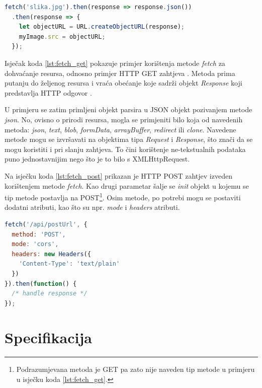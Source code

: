 \documentclass[times, utf8, zavrsni, numeric]{fer}
\newcommand{\razmakp}{\vspace{18pt}}
\newcommand{\razmaks}{\vspace{10pt}}
\begin{document}
\newpage

\razmakp
\begin{lstlisting}[language=JavaScript, caption={Primjer dohvata resursa s Fetch API}, label={lst:fetch_get}]
fetch('slika.jpg').then(response => response.json())
  .then(response => {
    let objectURL = URL.createObjectURL(response);
    myImage.src = objectURL;
  });
\end{lstlisting}
\razmaks

Isječak koda \ref{lst:fetch_get} pokazuje primjer korištenja metode \emph{fetch} za dohvaćanje resursa, odnosno primjer HTTP GET zahtjeva .
Metoda prima putanju do željenog resursa i vraća obećanje koje sadrži objekt \emph{Response} koji predstavlja HTTP odgovor .

U primjeru se zatim primljeni objekt parsira u JSON objekt pozivanjem metode \emph{json}.
No, ovisno o prirodi resursa, mogla se primjeniti bilo koja od navedenih metoda: \emph{json}, \emph{text}, \emph{blob}, \emph{formData}, \emph{arrayBuffer}, \emph{redirect} ili \emph{clone}\citep{fetch}.
Navedene metode mogu se izvršavati na objektima tipa \emph{Request} i \emph{Response}, što znači da se mogu koristiti i pri slanju zahtjeva.
To čini korištenje ne-tekstualnih podataka puno jednostavnijim nego što je to bilo s XMLHttpRequest.

\razmakp

Na isječku koda \ref{lst:fetch_post} prikazan je HTTP POST zahtjev  izveden korištenjem metode \emph{fetch}.
Kao drugi parametar šalje se \emph{init} objekt u kojemu se tip metode postavlja na POST\footnote{Podrazumjevana metoda je GET pa zato nije naveden tip metode u primjeru u isječku koda \ref{lst:fetch_get}.}.
Osim metode, po potrebi mogu se postaviti dodatni atributi, kao što su npr. \emph{mode} i \emph{headers} atributi.

\razmakp
\begin{lstlisting}[language=JavaScript, caption={Primjer slanja resursa s Fetch API}, label={lst:fetch_post}]
fetch('/api/postUrl', {
  method: 'POST', 
  mode: 'cors', 
  headers: new Headers({
    'Content-Type': 'text/plain'
  })
}).then(function() {
  /* handle response */
});
\end{lstlisting}
\razmaks



\chapter{Specifikacija}
\end{document}
